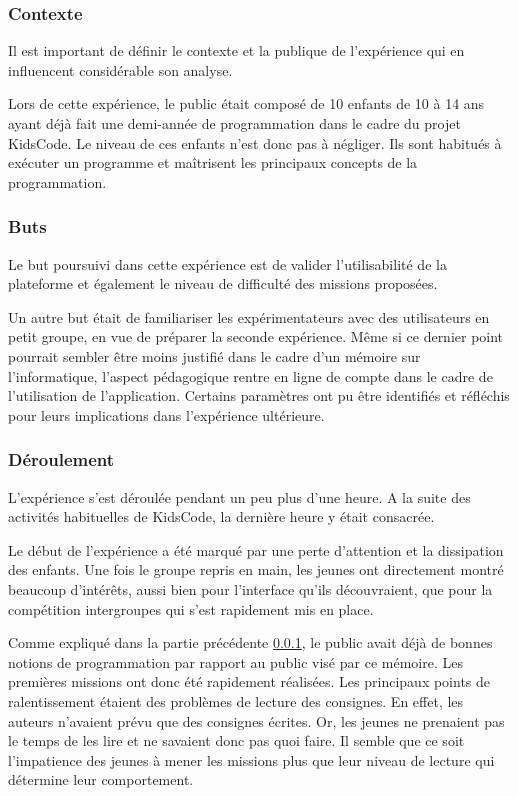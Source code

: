 \subsubsection{Contexte}
\label{context-kidscode}
Il est important de définir le contexte et la publique de l'expérience qui en influencent considérable son analyse.

Lors de cette expérience, le public était composé de 10 enfants de 10 à 14 ans ayant déjà fait une demi-année de programmation dans le cadre du projet KidsCode. Le niveau de ces enfants n'est donc pas à négliger. Ils sont habitués à exécuter un programme et maîtrisent les principaux concepts de la programmation.

\subsubsection{Buts}
Le but poursuivi dans cette expérience est de valider l'utilisabilité de la plateforme et également le niveau de difficulté des missions proposées. 

Un autre but était de familiariser les expérimentateurs avec des utilisateurs en petit groupe, en vue de préparer la seconde expérience.
Même si ce dernier point pourrait sembler être moins justifié dans le cadre d'un mémoire sur l'informatique, l'aspect pédagogique rentre en ligne de compte dans le cadre de l'utilisation de l'application. Certains paramètres ont pu être identifiés et réfléchis pour leurs implications dans l'expérience ultérieure.

\subsubsection{Déroulement}
L'expérience s'est déroulée pendant un peu plus d'une heure. A la suite des activités habituelles de KidsCode, la dernière heure y était consacrée. 

Le début de l'expérience a été marqué par une perte d'attention et la dissipation des enfants. Une fois le groupe repris en main, les jeunes ont directement montré beaucoup d'intérêts, aussi bien pour l'interface qu'ils découvraient, que pour la compétition intergroupes qui s'est rapidement mis en place.

Comme expliqué dans la partie précédente \ref{context-kidscode}, le public avait déjà de bonnes notions de programmation par rapport au public visé par ce mémoire. Les premières missions ont donc été rapidement réalisées. Les principaux points de ralentissement étaient des problèmes de lecture des consignes. En effet, les auteurs n'avaient prévu que des consignes écrites. Or, les jeunes ne prenaient pas le temps de les lire et ne savaient donc pas quoi faire. Il semble que ce soit l'impatience des jeunes à mener les missions plus que leur niveau de lecture qui détermine leur comportement.

